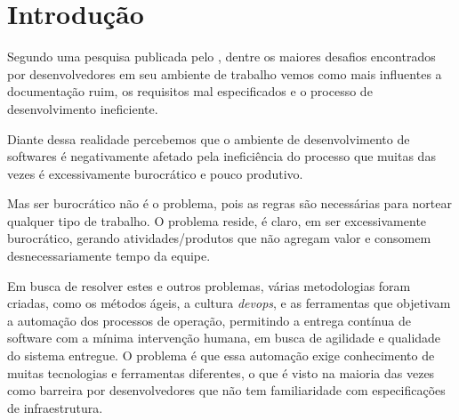 \documentclass[
	12pt,				%
	openright,			%
	twoside,			%
	a4paper,			%
	english,			%
	french,				%
	spanish,			%
	brazil,				%
	]{abntex2}
\begin{document}

\tableofcontents*
\cleardoublepage


\textual

\chapter{Introdução}
Segundo uma pesquisa publicada pelo , dentre os maiores desafios encontrados por desenvolvedores em seu ambiente de trabalho vemos como mais influentes a documentação ruim, os requisitos mal especificados e o processo de desenvolvimento ineficiente.

Diante dessa realidade percebemos que o ambiente de desenvolvimento de softwares é negativamente afetado pela ineficiência do processo que muitas das vezes é excessivamente burocrático e pouco produtivo.

 \begin{citacao}
Mas ser burocrático não é o problema, pois as regras são necessárias para nortear qualquer tipo de trabalho. O problema reside, é claro, em ser excessivamente burocrático, gerando atividades/produtos que não agregam valor e consomem desnecessariamente tempo da equipe. \cite{EBusiness:ManifestoAgil}
\end{citacao}

Em busca de resolver estes e outros problemas, várias metodologias foram criadas, como os métodos ágeis, a cultura \textit{devops}, e as ferramentas que objetivam a automação dos processos de operação, permitindo a entrega contínua de software com a mínima intervenção humana, em busca de agilidade e qualidade do sistema entregue. O problema é que essa automação exige conhecimento de muitas tecnologias e ferramentas diferentes, o que é visto na maioria das vezes como barreira por desenvolvedores que não tem familiaridade com especificações de infraestrutura.
\end{document}
